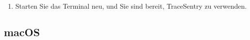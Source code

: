 \documentclass[a4paper,12pt]{report}
\begin{document}
\begin{enumerate}
        \begin{lstlisting}[label={lst:lstlisting-windows-4}]
Copy-Item "$env:TRACE_SENTRY_DIR\ts-daemon.bat" "$env:APPDATA\Microsoft\Windows\Start Menu\Programs\Startup"
        \end{lstlisting}
        Beim nächsten Systemstart wird der Daemon automatisch gestartet.
        Beim ersten Start kann eine Sicherheitswarnung erscheinen, in der Sie eine Checkbox deaktivieren müssen, damit diese in Zukunft nicht mehr erscheint.
        \item Starten Sie das Terminal neu, und Sie sind bereit, TraceSentry zu verwenden.
    \end{enumerate}

    \clearpage

    \subsection{macOS}\label{subsec:macos}
\end{document}
